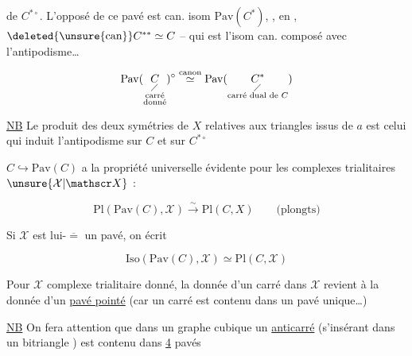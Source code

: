 
de $C^{*\circ}$. L'opposé de ce pavé  est can. isom   $\mathrm{Pav}(C^*)$,  , en  ,  $\deleted{\unsure{\text{can}}}C^{**}\simeq C$ -- qui est l'isom can. composé avec l'antipodisme\ldots

\[
\mathrm{Pav}(\underset{\substack{\diagup\\\text{carré}\\\text{donné}}}{C})^\circ
\overset{\text{canon}}{\simeq}
\mathrm{Pav}(\underset{\substack{\diagup\\\text{carré dual de }C}}{C^*})
\]

\uline{NB} Le produit des deux symétries de $X$ relatives aux triangles issus de $a$ est celui qui   induit l'antipodisme sur $C$ et sur $C^{*\circ}$

$C\hookrightarrow\mathrm{Pav}(C)$ a la propriété universelle évidente pour les complexes trialitaires $\unsure{\mathcal X|\mathscr X}$ :

\[
\mathrm{Pl}(\mathrm{Pav}(C),\mathcal X)\xrightarrow{\sim}\mathrm{Pl}(C,X)\qquad\text{(plongts)}
\]

Si $\mathcal X$ est lui-$\overline{=}$ un pavé, on écrit

\[
\mathrm{Iso}(\mathrm{Pav}(C),\mathcal X)\simeq\mathrm{Pl}(C,\mathcal X)
\]

Pour $\mathcal X$ complexe trialitaire donné,  la donnée d'un carré dans $\mathcal X$ revient à la donnée d'un \uline{pavé pointé} (car un carré est contenu dans un pavé unique\ldots)

\uline{NB} On fera attention que dans un graphe cubique un \uline{anticarré} (s'insérant  dans un bitriangle
) est contenu dans \uline{4} pavés

